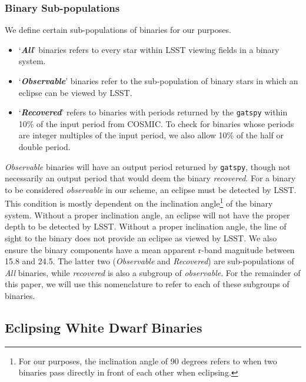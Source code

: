\documentclass[twocolumn]{aastex63}
\begin{document}
\subsubsection{Binary Sub-populations}
We define certain sub-populations of binaries for our purposes.

\begin{itemize}
    \item ‘\textbf{\textit{All}}’ binaries refers to every star  within LSST viewing fields in a binary system.
    \item ‘\textbf{\textit{Observable}}’ binaries refer to the sub-population of binary stars in which an eclipse can be viewed by LSST. 
    \item ‘\textbf{\textit{Recovered}}’ refers to binaries with periods returned by the \texttt{gatspy} within 10\% of the input period from COSMIC. To check for binaries whose periods are integer multiples of the input period, we also allow 10\% of the half or double period. 
\end{itemize}

\textit{Observable} binaries will have an output period returned by \texttt{gatspy}, though not necessarily an output period that would deem the binary \textit{recovered}. For a binary to be considered \textit{observable} in our scheme, an eclipse must be detected by LSST. This condition is mostly dependent on the inclination angle\footnote{For our purposes, the inclination angle of 90 degrees refers to when two binaries pass directly in front of each other when eclipsing.} of the binary system. Without a proper inclination angle, an eclipse will not have the proper depth to be detected by LSST.
Without a proper inclination angle, the line of sight to the binary does not provide an eclipse as viewed by LSST. We also ensure the binary components have a mean apparent r-band magnitude between 15.8 and 24.5. The latter two (\textit{Observable} and \textit{Recovered}) are sub-populations of \textit{All} binaries, while \textit{recovered} is also a subgroup of \textit{observable}. For the remainder of this paper, we will use this nomenclature to refer to each of these subgroups of binaries.

\subsection{Eclipsing White Dwarf Binaries} \label{subsec:wd}
\end{document}
